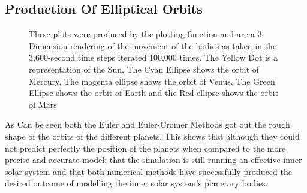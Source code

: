 \documentclass[a4paper,10pt]{article}
\begin{document}
\subsection{Production Of Elliptical Orbits}
 \begin{figure}[h]
        \caption{These plots were produced by the plotting function and are a 3 Dimension rendering of the movement of the bodies as taken in the 3,600-second time steps iterated 100,000 times. The Yellow Dot is a representation of the Sun, The Cyan Ellipse shows the orbit of Mercury, The magenta ellipse shows the orbit of Venus, The Green Ellipse shows the orbit of Earth and the Red ellipse shows the orbit of Mars}
        \label{plot:orbits}
     \end{figure}
 
 As Can be seen both the Euler and Euler-Cromer Methods got out the rough shape of the orbits of the different planets. This shows that although they could not predict perfectly the position of the planets when compared to the more precise and accurate model; that the simulation is still running an effective inner solar system and that both numerical methods have successfully produced the desired outcome of modelling the inner solar system's planetary bodies.
\end{document}
